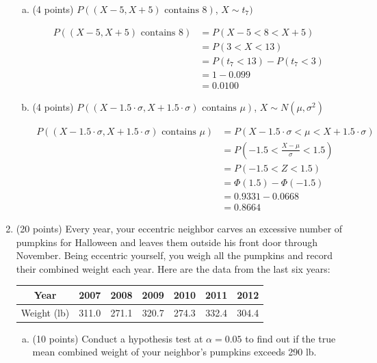 \documentclass{article}\usepackage{graphicx, color}
\numberwithin{equation}{section}
\begin{document}
\begin{flushleft}
\begin{enumerate}[1. ]
\begin{enumerate}[a. ]
\item (4 points) $P((X - 5, X + 5) \text{ contains } 8)$, $X \sim t_7)$

{\color{red}
\begin{align*}
P((X - 5, X + 5) \text{ contains } 8) &= P(X -5 < 8 < X + 5) \\
&= P(3 < X < 13) \\
&= P(t_{7} < 13) - P(t_{7} < 3) \\
&= 1 - 0.099 \\
&= 0.0100
\end{align*}
}


\item (4 points) $P((X - 1.5 \cdot \sigma, X + 1.5 \cdot \sigma) \text{ contains } \mu)$, $X \sim N(\mu,\sigma^2)$

{\color{red}
\begin{align*}
P((X - 1.5 \cdot \sigma, X + 1.5 \cdot \sigma) \text{ contains } \mu) &= P(X - 1.5 \cdot \sigma < \mu < X + 1.5 \cdot \sigma ) \\
&= P(-1.5 < \frac{X - \mu}{\sigma} < 1.5) \\
&= P(-1.5 < Z < 1.5) \\
&= \Phi(1.5) - \Phi(-1.5) \\
&= 0.9331 - 0.0668 \\
&= 0.8664
\end{align*}}


\end{enumerate}


\item (20 points) Every year, your eccentric neighbor carves an excessive number of pumpkins for Halloween and leaves them outside his front door through November. Being eccentric yourself, you weigh all the pumpkins and record their combined weight each year. Here are the data from the last six years: 

\begin{center}
\begin{tabular}{c|cccccc}
Year & 2007 & 2008 & 2009 & 2010 & 2011 & 2012 \\ \hline
Weight (lb) & 311.0 & 271.1 & 320.7 & 274.3 & 332.4 & 304.4   \\ 
\end{tabular}
\end{center}

\begin{enumerate}[a. ]
\item (10 points) Conduct a hypothesis test at $\alpha = 0.05$ to find out if the true mean combined weight of your neighbor's pumpkins exceeds 290 lb.


\end{enumerate}
\end{enumerate}
\end{flushleft}
\end{document}
